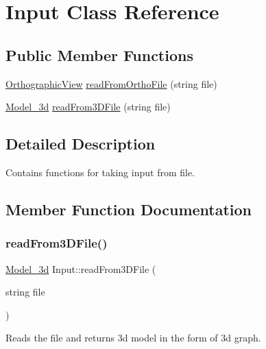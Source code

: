 \hypertarget{class_input}{}\section{Input Class Reference}
\label{class_input}
\subsection*{Public Member Functions}
\begin{DoxyCompactItemize}
\item 
\hyperlink{class_orthographic_view}{Orthographic\+View} \hyperlink{class_input_a839aa1704aa496dac35e491b2014102b}{read\+From\+Ortho\+File} (string file)
\item 
\hyperlink{class_model__3d}{Model\+\_\+3d} \hyperlink{class_input_ae5763dc9397101c1b32e3e6674281c5d}{read\+From3\+D\+File} (string file)
\end{DoxyCompactItemize}


\subsection{Detailed Description}
Contains functions for taking input from file. 

\subsection{Member Function Documentation}
\mbox{\label{class_input_ae5763dc9397101c1b32e3e6674281c5d}} 
\subsubsection{\texorpdfstring{read\+From3\+D\+File()}{readFrom3DFile()}}
{\footnotesize\ttfamily \hyperlink{class_model__3d}{Model\+\_\+3d} Input\+::read\+From3\+D\+File (\begin{DoxyParamCaption}\item[{string}]{file }\end{DoxyParamCaption})}

Reads the file and returns 3d model in the form of 3d graph. \mbox{\label{class_input_a839aa1704aa496dac35e491b2014102b}} 

